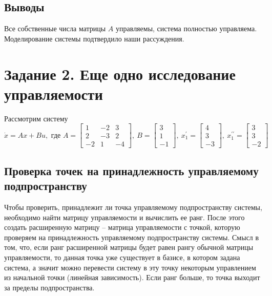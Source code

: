 \documentclass[a4paper, 12pt]{article}
\begin{document}
    \subsection{Выводы}
    Все собственные числа матрицы $A$ управляемы, система полностью управляема. Моделирование системы подтвердило наши рассуждения.


    \section{Задание 2. Еще одно исследование управляемости}
    Рассмотрим систему
    $$
    \dot{x}=Ax+Bu,\text{ где }A=\begin{bmatrix}
        1 &-2 &3\\
        2 &-3 &2\\
        -2 &1 &-4
    \end{bmatrix},\ B=\begin{bmatrix}
        3\\
        1\\
        -1
    \end{bmatrix},\ x_1^{\prime}=\begin{bmatrix}
        4\\
        3\\
        -3
    \end{bmatrix},\ x_1^{\prime\prime}=\begin{bmatrix}
        3\\
        3\\
        -2
    \end{bmatrix}
    $$


    \subsection{Проверка точек на принадлежность управляемому подпространству}
    Чтобы проверить, принадлежит ли точка управляемому подпространству системы, необходимо найти матрицу управляемости
    и вычислить ее ранг. После этого создать расширенную матрицу -- матрица управляемости с точкой, которую проверяем на принадлежность
    управляемому подпространству системы. Смысл в том, что, если ранг расширенной матрицы будет равен рангу обычной матрицы управляемости,
    то данная точка уже существует в базисе, в котором задана система, а значит можно перевести систему в эту точку некоторым управлением из
    начальной точки (линейная зависимость). Если ранг больше, то точка выходит за пределы подпространства.
\end{document}
